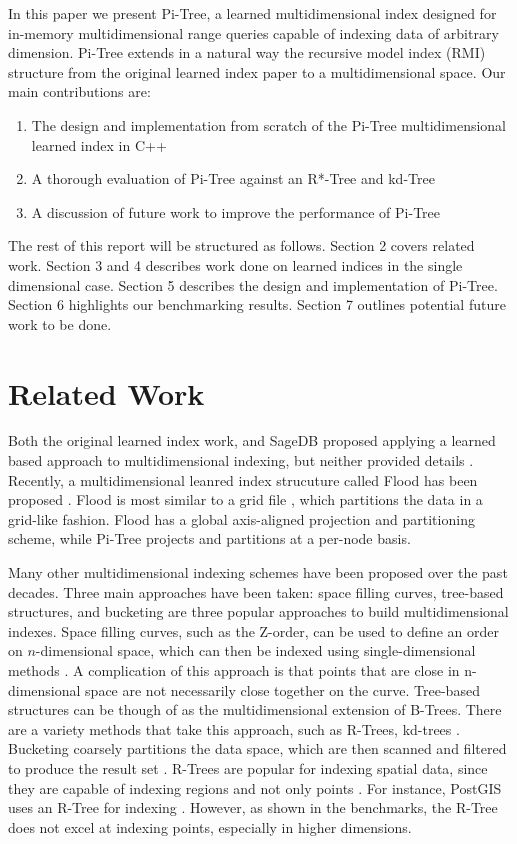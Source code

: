 \documentclass[sigconf,10pt]{acmart}
\begin{document}
In this paper we present Pi-Tree, a learned multidimensional index designed for
in-memory multidimensional range queries capable of indexing
data of arbitrary dimension. Pi-Tree extends in a natural way the recursive model index (RMI) structure
from the original learned index paper to a multidimensional space.
Our main contributions are:
\begin{enumerate}
  \item The design and implementation from scratch of the Pi-Tree multidimensional learned index in C++
  \item A thorough evaluation of Pi-Tree against an R*-Tree and kd-Tree 
  \item A discussion of future work to improve the performance of Pi-Tree
\end{enumerate}

The rest of this report will be structured as follows.
Section 2 covers related work. Section 3 and 4 describes
work done on learned indices in the single dimensional case.
Section 5 describes the design and implementation
of Pi-Tree. Section 6 highlights our benchmarking results. Section 7
outlines potential future work to be done.

\section{Related Work}

Both the original learned index work, and SageDB
proposed applying a learned based approach to multidimensional indexing,
but neither provided details \cite{Learned_Index,SageDB}.
Recently, a multidimensional leanred index strucuture called Flood has been proposed  \cite{Flood}. 
Flood is most similar to a grid file
\cite{Grid-File}, which partitions the data in a grid-like fashion.
Flood has a global axis-aligned projection and partitioning scheme,
while Pi-Tree projects and partitions at a per-node basis. 

Many other multidimensional indexing schemes have been proposed
over the past decades. Three main approaches have been taken:
space filling curves, tree-based structures, and bucketing are three popular approaches
to build multidimensional indexes. Space filling curves, such as the Z-order,
can be used to define an order on $n$-dimensional space, which can then be indexed using 
single-dimensional methods \cite{UB-Tree}. 
A complication of this approach is that points that are close in
n-dimensional space are not necessarily close together on the curve.
Tree-based structures can be though of as the multidimensional extension of B-Trees.
There are a variety methods that take this approach, such as R-Trees, kd-trees
\cite{R-Tree,R*-Tree,kd-Tree}.
Bucketing coarsely partitions the data space, which are then scanned and filtered to produce
the result set \cite{Grid-File,Flood}.
R-Trees are popular for indexing spatial data,
since they are capable of indexing regions and not only points \cite{R-Tree,R*-Tree}.
For instance, PostGIS uses an R-Tree for indexing \cite{PostGIS}.
However, as shown in the benchmarks, the R-Tree does not excel at 
indexing points, especially in higher dimensions.
\end{document}
